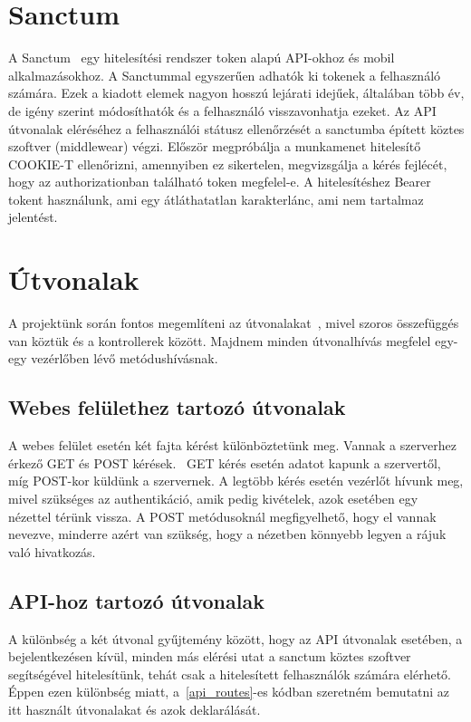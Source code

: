\documentclass[
]{thesis-ekf}
\theoremstyle{definition}
\theoremstyle{remark}
\begin{document}
	\section{Sanctum}
	A Sanctum~\cite{laravel_sanctum} egy hitelesítési rendszer token alapú API-okhoz és mobil alkalmazásokhoz. A Sanctummal egyszerűen adhatók ki tokenek a felhasználó számára. Ezek a kiadott elemek nagyon hosszú lejárati idejűek, általában több év, de igény szerint módosíthatók és a felhasználó visszavonhatja ezeket. Az API útvonalak eléréséhez a felhasználói státusz ellenőrzését a sanctumba épített köztes szoftver (middlewear) végzi. Először megpróbálja a munkamenet hitelesítő COOKIE-T ellenőrizni, amennyiben ez sikertelen, megvizsgálja a kérés fejlécét, hogy az authorizationban található token megfelel-e. A hitelesítéshez Bearer~\cite{bearer_token} tokent használunk, ami egy átláthatatlan karakterlánc, ami nem tartalmaz jelentést.
	
	\section{Útvonalak}
	A projektünk során fontos megemlíteni az útvonalakat~\cite{laravel_route}, mivel szoros összefüggés van köztük és a kontrollerek között. Majdnem minden útvonalhívás megfelel egy-egy vezérlőben lévő metódushívásnak. 
	
	\subsection{Webes felülethez tartozó útvonalak}
	A webes felület esetén két fajta kérést különböztetünk meg. Vannak a szerverhez érkező GET és POST kérések.~\cite{get_post_difference} GET kérés esetén adatot kapunk a szervertől, míg POST-kor küldünk a szervernek. A legtöbb kérés esetén vezérlőt hívunk meg, mivel szükséges az authentikáció, amik pedig kivételek, azok esetében egy nézettel térünk vissza. A POST metódusoknál megfigyelhető, hogy el vannak nevezve, minderre azért van szükség, hogy a nézetben könnyebb legyen a rájuk való hivatkozás. 
	
	\subsection{API-hoz tartozó útvonalak}
	A különbség a két útvonal gyűjtemény között, hogy az API útvonalak esetében, a bejelentkezésen kívül, minden más elérési utat a sanctum köztes szoftver segítségével hitelesítünk, tehát csak a hitelesített felhasználók számára elérhető. Éppen ezen különbség miatt, a~\ref{api_routes}-es kódban szeretném bemutatni az itt használt útvonalakat és azok deklarálását.
	
\end{document}
